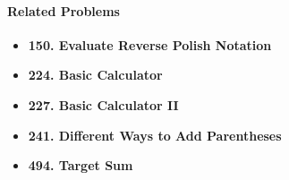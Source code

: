 \paragraph{Related Problems}
\begin{itemize}
\item \textbf{150. Evaluate Reverse Polish Notation}
\item \textbf{224. Basic Calculator}
\item \textbf{227. Basic Calculator II}
\item \textbf{241. Different Ways to Add Parentheses}
\item \textbf{494. Target Sum}
\end{itemize}